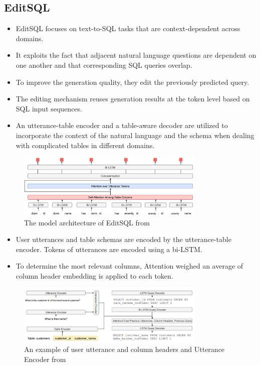 \subsection{EditSQL}

\begin{itemize}
    \item EditSQL focuses on text-to-SQL tasks that are context-dependent across domains.
    \item It exploits the fact that adjacent natural language questions are dependent on one another and that corresponding SQL queries overlap.
    \item To improve the generation quality, they edit the previously predicted query.
    \item The editing mechanism reuses generation results at the token level based on SQL input sequences.
    \item An utterance-table encoder and a table-aware decoder are utilized to incorporate the context of the natural language and the schema when dealing with complicated tables in different domains.
\end{itemize}

\begin{figure}[htb]
    \centering
    \includegraphics[width=0.8\textwidth]{pics/EditSQL/Table.png}
    \caption{The model architecture of EditSQL from \cite{DBLP:journals/corr/abs-1909-00786}}
    \label{fig:EditSQL}
\end{figure}


\begin{itemize}
    \item User utterances and table schemas are encoded by the utterance-table encoder. Tokens of utterances are encoded using a bi-LSTM.
    \item To determine the most relevant columns, Attention weighed an average of column header embedding is applied to each token.
\end{itemize}

\begin{figure}[htb]
    \centering
    \includegraphics[width=0.8\textwidth]{pics/EditSQL/model.png}
    \caption{An example of user utterance and column headers and Utterance Encoder from \cite{DBLP:journals/corr/abs-1909-00786}}
    \label{fig:EditSQL_model}
\end{figure}


